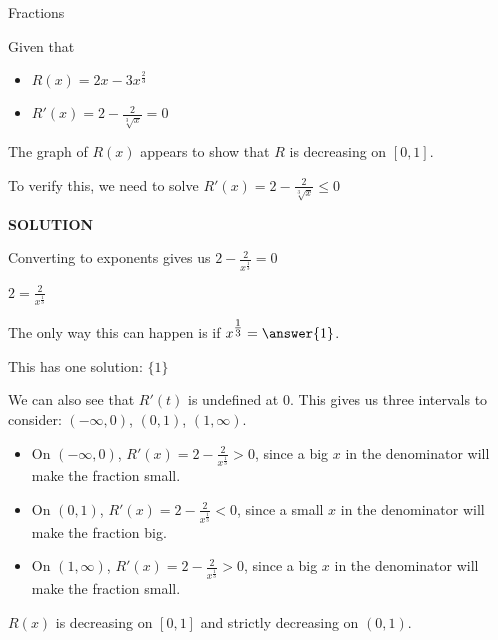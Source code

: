 \documentclass{ximera}
\begin{document}
\begin{example}  Fractions


Given that

\begin{itemize}
\item $R(x) = 2x - 3 x^{\tfrac{2}{3}}$
\item $R'(x) = 2 - \frac{2}{\sqrt[3]{x}} = 0$
\end{itemize}


The graph of $R(x)$ appears to show that $R$ is decreasing on $[0, 1]$.
\begin{center}
\end{center}










To verify this, we need to solve $R'(x) = 2 - \frac{2}{\sqrt[3]{x}}  \leq 0$



\textbf{\textcolor{purple!50!blue!90!black}{SOLUTION}}


Converting to exponents gives us $2 - \frac{2}{x^{\tfrac{1}{3}}} = 0$


$2 = \frac{2}{x^{\tfrac{1}{3}}}$

The only way this can happen is if $x^{\tfrac{1}{3}} = \answer{1}$.

This has one solution: $\{  1  \}$



We can also see that $R'(t)$ is undefined at $0$.  This gives us three intervals to consider: $(-\infty, 0)$, $(0, 1)$, $(1, \infty)$.



\begin{itemize}
\item On $(-\infty, 0)$, $R'(x) = 2 - \frac{2}{x^{\tfrac{1}{3}}} > 0$, since a big $x$ in the denominator will make the fraction small.
\item On $(0,1)$, $R'(x) = 2 - \frac{2}{x^{\tfrac{1}{3}}} < 0$, since a small $x$ in the denominator will make the fraction big.
\item On $(1,\infty)$, $R'(x) = 2 - \frac{2}{x^{\tfrac{1}{3}}} > 0$, since a big $x$ in the denominator will make the fraction small.
\end{itemize}


$R(x)$ is decreasing on $[0,1]$ and strictly decreasing on $(0,1)$.

\end{example}
\end{document}

